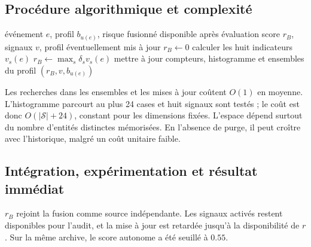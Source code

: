 \documentclass[11pt,a4paper,oneside]{report}
\theoremstyle{definition}
\theoremstyle{plain}
\begin{document}
\subsection*{Procédure algorithmique et complexité}

\begin{algorithm}[H]
\caption{Évaluation et apprentissage prudent du profil UEBA}
\label{alg:ai-ro-ueba}
\begin{algorithmic}[1]
\Require événement $e$, profil $b_{u(e)}$, risque fusionné disponible après évaluation
\Ensure score $r_B$, signaux $v$, profil éventuellement mis à jour
  \State $r_B\leftarrow0$
\Else
  \State calculer les huit indicateurs $v_s(e)$
  \State $r_B\leftarrow\max_s\delta_sv_s(e)$
\EndIf
{}
  \State mettre à jour compteurs, histogramme et ensembles du profil
\EndIf
\State \Return $(r_B,v,b_{u(e)})$
\end{algorithmic}
\end{algorithm}

Les recherches dans les ensembles et les mises à jour coûtent $O(1)$ en moyenne. L'histogramme parcourt au plus 24 cases et huit signaux sont testés ; le coût est donc $O(|\mathcal{S}|+24)$, constant pour les dimensions fixées. L'espace dépend surtout du nombre d'entités distinctes mémorisées. En l'absence de purge, il peut croître avec l'historique, malgré un coût unitaire faible.

\subsection*{Intégration, expérimentation et résultat immédiat}

$r_B$ rejoint la fusion comme source indépendante. Les signaux activés restent disponibles pour l'audit, et la mise à jour est retardée jusqu'à la disponibilité de $r$. Sur la même archive, le score autonome a été seuillé à $0.55$.

\begin{table}[H]
\centering
\caption{Résultat archivé de l'UEBA, $n=300$, seuil $0.55$.}
\label{tab:method-ueba-results}
\small
{}
\end{table}
\end{document}

